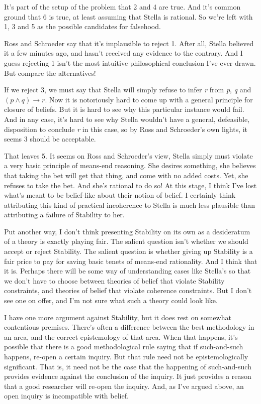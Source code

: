 \documentclass[11pt,]{book}
\begin{document}
It's part of the setup of the problem that 2 and 4 are true. And it's common ground that 6 is true, at least assuming that Stella is rational. So we're left with 1, 3 and 5 as the possible candidates for falsehood.

Ross and Schroeder say that it's implausible to reject 1. After all, Stella believed it a few minutes ago, and hasn't received any evidence to the contrary. And I guess rejecting 1 isn't the most intuitive philosophical conclusion I've ever drawn. But compare the alternatives!

If we reject 3, we must say that Stella will simply refuse to infer \emph{r} from \emph{p}, \emph{q} and \((p \wedge q) \rightarrow r\). Now it is notoriously hard to come up with a general principle for closure of beliefs. But it is hard to see why this particular instance would fail. And in any case, it's hard to see why Stella wouldn't have a general, defeasible, disposition to conclude \emph{r} in this case, so by Ross and Schroeder's own lights, it seems 3 should be acceptable.

That leaves 5. It seems on Ross and Schroeder's view, Stella simply must violate a very basic principle of means-end reasoning. She desires something, she believes that taking the bet will get that thing, and come with no added costs. Yet, she refuses to take the bet. And she's rational to do so! At this stage, I think I've lost what's meant to be belief-like about their notion of belief. I certainly think attributing this kind of practical incoherence to Stella is much less plausible than attributing a failure of Stability to her.

Put another way, I don't think presenting Stability on its own as a desideratum of a theory is exactly playing fair. The salient question isn't whether we should accept or reject Stability. The salient question is whether giving up Stability is a fair price to pay for saving basic tenets of means-end rationality. And I think that it is. Perhaps there will be some way of understanding cases like Stella's so that we don't have to choose between theories of belief that violate Stability constraints, and theories of belief that violate coherence constraints. But I don't see one on offer, and I'm not sure what such a theory could look like.

I have one more argument against Stability, but it does rest on somewhat contentious premises. There's often a difference between the best methodology in an area, and the correct epistemology of that area. When that happens, it's possible that there is a good methodological rule saying that if such-and-such happens, re-open a certain inquiry. But that rule need not be epistemologically significant. That is, it need not be the case that the happening of such-and-such provides evidence against the conclusion of the inquiry. It just provides a reason that a good researcher will re-open the inquiry. And, as I've argued above, an open inquiry is incompatible with belief.
\end{document}
